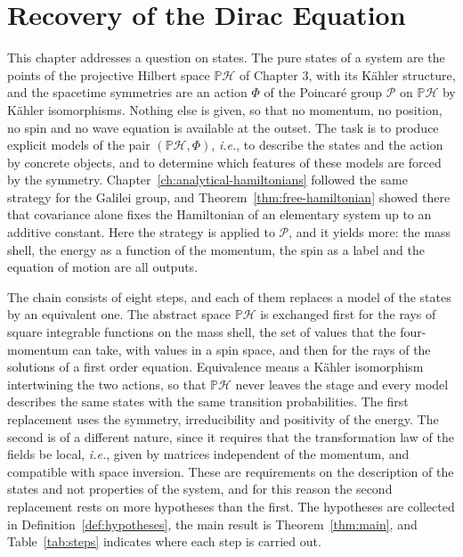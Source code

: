 
\setlength{\headwidth}{\textwidth}


	\setcounter{chapter}{5}

\chapter{Recovery of the Dirac Equation}
\label{ch:dirac}

This chapter addresses a question on states. The pure states of a system are the points of the projective Hilbert space $\mathbb{P}\mathcal{H}$ of Chapter 3, with its Kähler structure, and the spacetime symmetries are an action $\Phi$ of the Poincar\'e group $\mathcal{P}$ on $\mathbb{P}\mathcal{H}$ by Kähler isomorphisms. Nothing else is given, so that no momentum, no position, no spin and no wave equation is available at the outset. The task is to produce explicit models of the pair $(\mathbb{P}\mathcal{H},\Phi)$, \textit{i.e.}, to describe the states and the action by concrete objects, and to determine which features of these models are forced by the symmetry. Chapter~\ref{ch:analytical-hamiltonians} followed the same strategy for the Galilei group, and Theorem~\ref{thm:free-hamiltonian} showed there that covariance alone fixes the Hamiltonian of an elementary system up to an additive constant. Here the strategy is applied to $\mathcal{P}$, and it yields more: the mass shell, the energy as a function of the momentum, the spin as a label and the equation of motion are all outputs.

The chain consists of eight steps, and each of them replaces a model of the states by an equivalent one. The abstract space $\mathbb{P}\mathcal{H}$ is exchanged first for the rays of square integrable functions on the mass shell, the set of values that the four-momentum can take, with values in a spin space, and then for the rays of the solutions of a first order equation. Equivalence means a Kähler isomorphism intertwining the two actions, so that $\mathbb{P}\mathcal{H}$ never leaves the stage and every model describes the same states with the same transition probabilities. The first replacement uses the symmetry, irreducibility and positivity of the energy. The second is of a different nature, since it requires that the transformation law of the fields be local, \textit{i.e.}, given by matrices independent of the momentum, and compatible with space inversion. These are requirements on the description of the states and not properties of the system, and for this reason the second replacement rests on more hypotheses than the first. The hypotheses are collected in Definition~\ref{def:hypotheses}, the main result is Theorem~\ref{thm:main}, and Table~\ref{tab:steps} indicates where each step is carried out.


